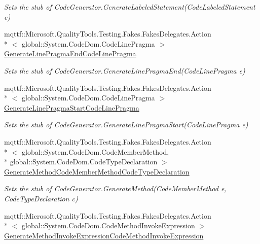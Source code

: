 \begin{DoxyCompactItemize}
\begin{DoxyCompactList}\small\item\em Sets the stub of Code\-Generator.\-Generate\-Labeled\-Statement(\-Code\-Labeled\-Statement e)\end{DoxyCompactList}\item 
mqttf\-::\-Microsoft.\-Quality\-Tools.\-Testing.\-Fakes.\-Fakes\-Delegates.\-Action\\*
$<$ global\-::\-System.\-Code\-Dom.\-Code\-Line\-Pragma $>$ \hyperlink{class_system_1_1_code_dom_1_1_compiler_1_1_fakes_1_1_stub_code_generator_a4f26d649f8a1ab5a982acd0dd726a9a0}{Generate\-Line\-Pragma\-End\-Code\-Line\-Pragma}
\begin{DoxyCompactList}\small\item\em Sets the stub of Code\-Generator.\-Generate\-Line\-Pragma\-End(\-Code\-Line\-Pragma e)\end{DoxyCompactList}\item 
mqttf\-::\-Microsoft.\-Quality\-Tools.\-Testing.\-Fakes.\-Fakes\-Delegates.\-Action\\*
$<$ global\-::\-System.\-Code\-Dom.\-Code\-Line\-Pragma $>$ \hyperlink{class_system_1_1_code_dom_1_1_compiler_1_1_fakes_1_1_stub_code_generator_aa06d0252279284814e1a4b022627c946}{Generate\-Line\-Pragma\-Start\-Code\-Line\-Pragma}
\begin{DoxyCompactList}\small\item\em Sets the stub of Code\-Generator.\-Generate\-Line\-Pragma\-Start(\-Code\-Line\-Pragma e)\end{DoxyCompactList}\item 
mqttf\-::\-Microsoft.\-Quality\-Tools.\-Testing.\-Fakes.\-Fakes\-Delegates.\-Action\\*
$<$ global\-::\-System.\-Code\-Dom.\-Code\-Member\-Method, \\*
global\-::\-System.\-Code\-Dom.\-Code\-Type\-Declaration $>$ \hyperlink{class_system_1_1_code_dom_1_1_compiler_1_1_fakes_1_1_stub_code_generator_aac10edfde1e658d056bb4d7e903afc1c}{Generate\-Method\-Code\-Member\-Method\-Code\-Type\-Declaration}
\begin{DoxyCompactList}\small\item\em Sets the stub of Code\-Generator.\-Generate\-Method(\-Code\-Member\-Method e, Code\-Type\-Declaration c)\end{DoxyCompactList}\item 
mqttf\-::\-Microsoft.\-Quality\-Tools.\-Testing.\-Fakes.\-Fakes\-Delegates.\-Action\\*
$<$ global\-::\-System.\-Code\-Dom.\-Code\-Method\-Invoke\-Expression $>$ \hyperlink{class_system_1_1_code_dom_1_1_compiler_1_1_fakes_1_1_stub_code_generator_a612b7b08e0d0ca553564881236dd029d}{Generate\-Method\-Invoke\-Expression\-Code\-Method\-Invoke\-Expression}

\end{DoxyCompactItemize}
